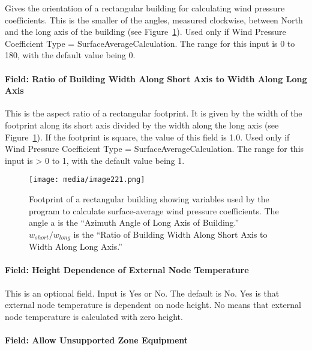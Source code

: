 Gives the orientation of a rectangular building for calculating wind pressure coefficients. This is the smaller of the angles, measured clockwise, between North and the long axis of the building (see Figure~\ref{fig:footprint-of-a-rectangular-building-showing}). Used only if Wind Pressure Coefficient Type = SurfaceAverageCalculation. The range for this input is 0 to 180, with the default value being 0.

\paragraph{Field: Ratio of Building Width Along Short Axis to Width Along Long Axis}\label{field-ratio-of-building-width-along-short-axis-to-width-along-long-axis}

This is the aspect ratio of a rectangular footprint. It is given by the width of the footprint along its short axis divided by the width along the long axis (see Figure~\ref{fig:footprint-of-a-rectangular-building-showing}). If the footprint is square, the value of this field is 1.0. Used only if Wind Pressure Coefficient Type = SurfaceAverageCalculation. The range for this input is \textgreater{} 0 to 1, with the default value being 1.

\begin{figure}[hbtp] %
\centering
\texttt{[image: media/image221.png]}
\caption{Footprint of a rectangular building showing variables used by the program to calculate surface-average wind pressure coefficients. The angle a is the ``Azimuth Angle of Long Axis of Building.''  $w_{short}/w_{long}$ is the ``Ratio of Building Width Along Short Axis to Width Along Long Axis.'' \protect \label{fig:footprint-of-a-rectangular-building-showing}}
\end{figure}

\paragraph{Field: Height Dependence of External Node Temperature}\label{field-height-dependence-of-external-node-temperature}

This is an optional field. Input is Yes or No. The default is No. Yes is that external node temperature is dependent on node height. No means that external node temperature is calculated with zero height.

\paragraph{Field: Allow Unsupported Zone Equipment}\label{allow-unsupported-zone-equipment}


